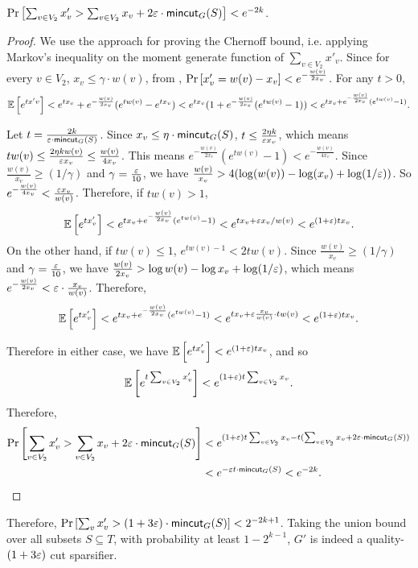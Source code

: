 \begin{claim}
$\mathrm{Pr}\left[ \sum_{v\in V_2} x'_v > \sum_{v\in V_2} x_v + 2{\varepsilon}\cdot \mathsf{mincut}_G(S) \right] <e^{-2k}$.
\end{claim}
\begin{proof}
We use the approach for proving the Chernoff bound, i.e. applying Markov's inequality on the moment generate function of $\sum_{v \in V_2} x'_v$. Since for every $v \in V_2$, $x_v \le \gamma \cdot w(v)$, from , $\mathrm{Pr}\left[ x'_v = w(v)-x_v \right] < e^{-\frac{w(v)}{2x_v}}$. For any $t>0$, 
\begin{align*}
{\mathbb{E}}\left[ e^{tx'v} \right] < e^{tx_v} + e^{-\frac{w(v)}{2x_v}}(e^{tw(v)}-e^{tx_v}) < e^{tx_v}(1+e^{-\frac{w(v)}{2x_v}}(e^{tw(v)}-1)) < e^{tx_v + e^{-\frac{w(v)}{2x_v}}(e^{tw(v)}-1)}.
\end{align*}

Let $t = \frac{2k}{{\varepsilon} \cdot\mathsf{mincut}_G(S)}$. Since $x_v \le \eta \cdot\mathsf{mincut}_G(S)$, $t \le \frac{2 \eta k}{{\varepsilon} x_v}$, which means $tw(v) \le \frac{2\eta k w(v)}{{\varepsilon} x_v} \le \frac{w(v)}{4x_v}$. This means $e^{-\frac{w(v)}{2x_v}}(e^{tw(v)}-1)< e^{-\frac{w(v)}{4x_v}}$. Since $\frac{w(v)}{x_v} \ge (1/\gamma)$ and $\gamma=\frac{{\varepsilon}}{10}$, we have $\frac{w(v)}{x_v}>4( \log (w(v))-\log(x_v) + \log (1/{\varepsilon}))$. So $e^{-\frac{w(v)}{4x_v}}<\frac{{\varepsilon} x_v}{w(v)}$. Therefore, if $tw(v) > 1$,
$$
{\mathbb{E}}\left[ e^{tx'_v} \right]<e^{tx_v + e^{-\frac{w(v)}{2x_v}}(e^{tw(v)}-1)}<e^{tx_v + {\varepsilon} x_v/w(v)}<e^{(1+{\varepsilon})tx_v}.
$$
On the other hand, if $tw(v) \le 1$, $e^{tw(v)-1} < 2tw(v)$. Since $\frac{w(v)}{x_v} \ge (1/\gamma)$ and $\gamma=\frac{{\varepsilon}}{10}$, we have $\frac{w(v)}{2x_v} > \log w(v) - \log x_v + \log (1/{\varepsilon})$, which means $e^{-\frac{w(v)}{2x_v}}<{\varepsilon}\cdot \frac{x_v}{w(v)}$. Therefore,
$$
{\mathbb{E}}\left[ e^{tx'_v} \right]<e^{tx_v + e^{-\frac{w(v)}{2x_v}}(e^{tw(v)}-1)}<e^{tx_v + {\varepsilon}\frac{x_v}{w(v)} \cdot tw(v)} < e^{(1+{\varepsilon})tx_v}.
$$

Therefore in either case, we have ${\mathbb{E}}\left[ e^{tx'_v} \right]<e^{(1+{\varepsilon})tx_v}$, and so
$${\mathbb{E}}\left[ e^{t\sum_{v\in V_2} x'_v} \right] < e^{(1+{\varepsilon})t\sum_{v\in V_2} x_v}.$$ 
Therefore,
\[
\begin{split}
\mathrm{Pr}\left[ \sum_{v\in V_2} x'_v > \sum_{v\in V_2} x_v + 2{\varepsilon} \cdot\mathsf{mincut}_G(S) \right] & < e^{(1+{\varepsilon})t\sum_{v\in V_2} x_v-t(\sum_{v \in V_2} x_v + 2{\varepsilon} \cdot\mathsf{mincut}_G(S))}\\
& < e^{-{\varepsilon} t \cdot\mathsf{mincut}_G(S)}<e^{-2k}.
\end{split}
\]
\end{proof}

Therefore, $\mathrm{Pr}\left[ \sum_v x'_v > (1+3{\varepsilon})\cdot\mathsf{mincut}_G(S) \right] < 2^{-2k+1}$. Taking the union bound over all subsets $S\subseteq T$, with probability at least $1-2^{k-1}$, $G'$ is indeed a quality-$(1+3{\varepsilon})$ cut sparsifier.






























